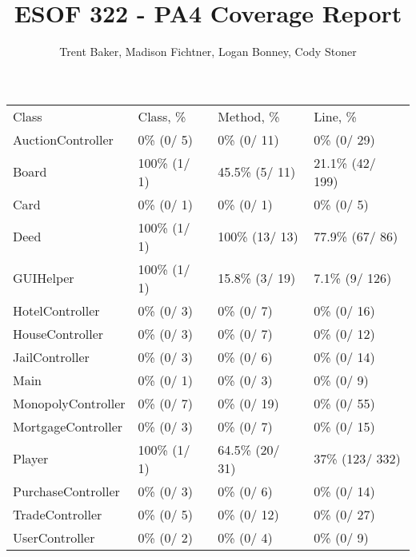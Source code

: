 \documentclass[10pt,letterpaper]{article}
\author{Trent Baker, Madison Fichtner, Logan Bonney, Cody Stoner}
\title{ESOF 322 - PA4 Coverage Report}
\begin{document}
\maketitle
\begin{tabularx}{\linewidth}{X X X X}
Class & Class, \% & Method, \% & Line, \% \\
AuctionController & 0\% (0/ 5) & 0\% (0/ 11) & 0\% (0/ 29) \\
Board & 100\% (1/ 1) & 45.5\% (5/ 11) & 21.1\% (42/ 199) \\
Card & 0\% (0/ 1) & 0\% (0/ 1) & 0\% (0/ 5) \\
Deed & 100\% (1/ 1) & 100\% (13/ 13) & 77.9\% (67/ 86) \\
GUIHelper & 100\% (1/ 1) & 15.8\% (3/ 19) & 7.1\% (9/ 126) \\
HotelController & 0\% (0/ 3) & 0\% (0/ 7) & 0\% (0/ 16) \\
HouseController & 0\% (0/ 3) & 0\% (0/ 7) & 0\% (0/ 12) \\
JailController & 0\% (0/ 3) & 0\% (0/ 6) & 0\% (0/ 14) \\
Main & 0\% (0/ 1) & 0\% (0/ 3) & 0\% (0/ 9) \\
MonopolyController & 0\% (0/ 7) & 0\% (0/ 19) & 0\% (0/ 55) \\
MortgageController & 0\% (0/ 3) & 0\% (0/ 7) & 0\% (0/ 15) \\
Player & 100\% (1/ 1) & 64.5\% (20/ 31) & 37\% (123/ 332) \\
PurchaseController & 0\% (0/ 3) & 0\% (0/ 6) & 0\% (0/ 14) \\
TradeController & 0\% (0/ 5) & 0\% (0/ 12) & 0\% (0/ 27) \\
UserController & 0\% (0/ 2) & 0\% (0/ 4) & 0\% (0/ 9) \\
\end{tabularx}
\end{document}
